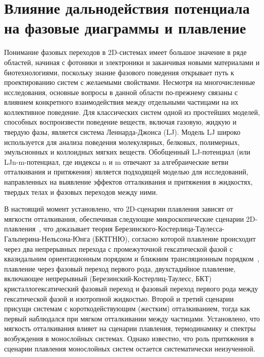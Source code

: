 \section{Влияние дальнодействия потенциала на фазовые диаграммы и плавление}

Понимание фазовых переходов в 2D-системах имеет большое значение в ряде областей, начиная с фотоники и электроники  и заканчивая новыми материалами и биотехнологиями, поскольку знание фазового поведения открывает путь к проектированию систем с желаемыми свойствами. 
Несмотря на многочисленные исследования, основные вопросы в данной области по-прежнему связаны с влиянием конкретного взаимодействия между отдельными частицами на их коллективное поведение. 
Для классических систем одной из простейших моделей, способных воспроизвести поведение веществ, включая газовую, жидкую и твердую фазы, является система Леннарда-Джонса (LJ). 
Модель LJ широко используется для анализа поведения молекулярных, белковых, полимерных, эмульсионных и коллоидных мягких веществ. 
Обобщенный LJ-потенциал (или LJn-m-потенциал, где индексы n и m отвечают за алгебраические ветви отталкивания и притяжения) является подходящей моделью для исследований, направленных на выявление эффектов отталкивания и притяжения в жидкостях, твердых телах и фазовых переходов между ними.

В настоящий момент установлено, что 2D-сценарии плавления зависят от мягкости отталкивания, обеспечивая следующие микроскопические сценарии 2D-плавления~\cite{10.3367/ufne.2017.06.038161, 10.3367/ufne.2018.04.038417}, что доказывает теория Березинского-Костерлица-Таулесса-Гальперина-Нельсона-Юнга (БКТГНЮ), согласно которой плавление происходит через два непрерывных перехода с промежуточной гексатической фазой с квазидальним ориентационным порядком и ближним трансляционным порядком~\cite{10.1088/0022-3719/6/7/010, 10.1103/physrevlett.41.121, 10.1103/physrevb.19.2457, 10.1103/physrevb.19.1855}, плавление через фазовый переход первого рода, двухстадийное плавление, включающее непрерывный (Березинский-Костерлиц-Таулесс, БКТ) кристаллогексатический фазовый переход и фазовый переход первого рода между гексатической фазой и изотропной жидкостью.
Второй и третий сценарии присущи системам с короткодействующим (жестким) отталкиванием, тогда как первый наблюдался при мягком отталкивании между частицами. 
Установлено, что мягкость отталкивания влияет на сценарии плавления, термодинамику и спектры возбуждения в монослойных системах. 
Однако известно, что роль притяжения в сценарии плавления монослойных систем остается систематически неизученной.

